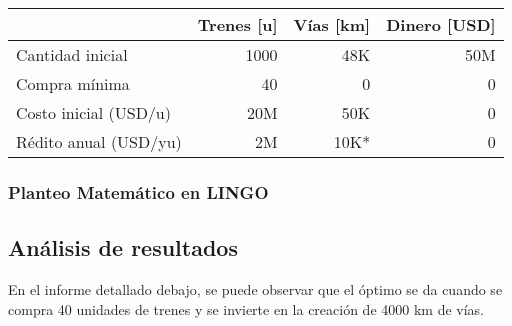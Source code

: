 \documentclass[10pt, a4paper, titlepage,
	oneside,
	fleqn, leqno]{article}
\begin{document}
\begin{tabular}{|l|r|r|r|} \hline
    & Trenes [u] & Vías [km] & Dinero [USD]\\ \hline
  Cantidad inicial & 1000 & 48K & 50M\\ \hline
  Compra mínima & 40 & 0 & 0\\ \hline
  Costo inicial (USD/u) & 20M & 50K & 0\\ \hline
  Rédito anual (USD/yu) & 2M & 10K* & 0\\ \hline
\end{tabular}

\subsubsection{Planteo Matemático en LINGO}


\subsection{Análisis de resultados}
En el informe detallado debajo, se puede observar que el óptimo se da cuando se compra 40 unidades de trenes y se invierte en la creación de 4000 km de vías.  
\end{document}
